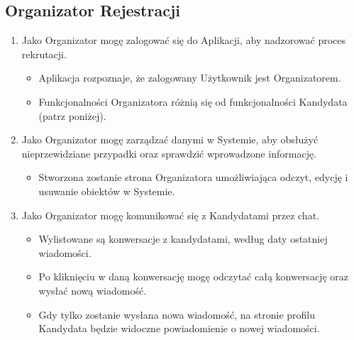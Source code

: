 \documentclass{article}
\begin{document}
\subsection{Organizator Rejestracji}
\begin{enumerate}
  \item Jako Organizator mogę zalogować się do Aplikacji, aby nadzorować proces rekrutacji.
      \begin{itemize}
         \item Aplikacja rozpoznaje, że zalogowany Użytkownik jest Organizatorem.
         \item Funkcjonalności Organizatora różnią się od funkcjonalności Kandydata (patrz poniżej).
       \end{itemize}
  \item Jako Organizator mogę zarządzać danymi w Systemie, aby obsłużyć nieprzewidziane przypadki oraz sprawdzić wprowadzone informację.
      \begin{itemize}
         \item Stworzona zostanie strona Organizatora umożliwiająca odczyt, edycję i usuwanie obiektów w Systemie.
       \end{itemize}
  \item Jako Organizator mogę komunikować się z Kandydatami przez chat.
      \begin{itemize}
         \item Wylistowane są konwersacje z kandydatami, według daty ostatniej wiadomości.
         \item Po kliknięciu w daną konwersację mogę odczytać całą konwersację oraz wysłać nową wiadomość.
         \item Gdy tylko zostanie wysłana nowa wiadomość, na stronie profilu Kandydata będzie widoczne powiadomienie o nowej wiadomości.
       \end{itemize}

\end{enumerate}
\end{document}
